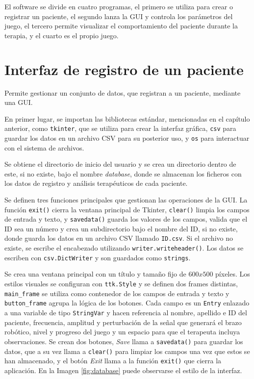 El software se divide en cuatro programas, el primero se utiliza para crear o registrar un paciente, el segundo lanza la GUI y controla los parámetros del juego, el tercero permite visualizar el comportamiento del paciente durante la terapia, y el cuarto es el propio juego.

\section{Interfaz de registro de un paciente}
\label{section:registro}

Permite gestionar un conjunto de datos, que registran a un paciente, mediante una GUI.

En primer lugar, se importan las bibliotecas estándar, mencionadas en el capítulo anterior, como \verb|tkinter|, que se utiliza para crear la interfaz gráfica, \verb|csv| para guardar los datos en un archivo CSV para su posterior uso, y \verb|os| para interactuar con el sistema de archivos.

Se obtiene el directorio de inicio del usuario y se crea un directorio dentro de este, si no existe, bajo el nombre \textit{database}, donde se almacenan los ficheros con los datos de registro y análisis terapéuticos de cada paciente.

Se definen tres funciones principales que gestionan las operaciones de la GUI.
La función \verb|exit()| cierra la ventana principal de Tkinter, \verb|clear()| limpia los campos de entrada y texto, y \verb|savedata()| guarda los valores de los campos, valida que el ID sea un número y crea un subdirectorio bajo el nombre del ID, si no existe, donde guarda los datos en un archivo CSV llamado \verb|ID.csv|.
Si el archivo no existe, se escribe el encabezado utilizando \verb|writer.writeheader()|.
Los datos se escriben con \verb|csv.DictWriter| y son guardados como \verb|strings|.

Se crea una ventana principal con un título y tamaño fijo de $600x500$ píxeles.
Los estilos visuales se configuran con \verb|ttk.Style| y se definen dos frames distintas, \verb|main_frame| se utiliza como contenedor de los campos de entrada y texto y \verb|button_frame| agrupa la lógica de los botones.
Cada campo es un \verb|Entry| enlazado a una variable de tipo \verb|StringVar| y hacen referencia al nombre, apellido e ID del paciente, frecuencia, amplitud y perturbación de la señal que generará el brazo robótico, nivel y progreso del juego y un espacio para que el terapeuta incluya observaciones.
Se crean dos botones, \textit{Save} llama a \verb|savedata()| para guardar los datos, que a su vez llama a \verb|clear()| para limpiar los campos una vez que estos se han almacenado, y el botón \textit{Exit} llama a la función \verb|exit()| que cierra la aplicación.
En la Imagen \ref{fig:database} puede observarse el estilo de la interfaz.

